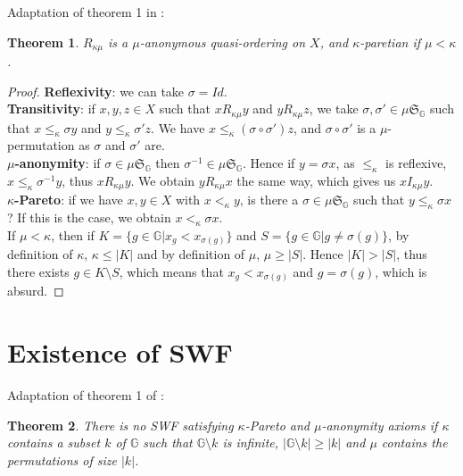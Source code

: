 \documentclass{article}
\newcommand{\G}{\mathbb{G}}
\newtheorem{theorem}{Theorem}
\begin{document}
Adaptation of theorem 1 in \cite{svensson80}:
\begin{theorem}
    $R_{\kappa\mu}$ is a $\mu$-anonymous quasi-ordering on $X$, and $\kappa$-paretian if
    $\mu < \kappa$. %
\end{theorem}
\begin{proof}
    \textbf{Reflexivity}: we can take $\sigma = Id$.\\
    \textbf{Transitivity}: if $x,y,z\in X$ such that $x R_{\kappa\mu} y$ and $y R_{\kappa\mu} z$,
    we take $\sigma,\sigma'\in \mu\mathfrak{S}_\G$ such that $x\leq_\kappa \sigma y$ and
    $y\leq_\kappa \sigma' z$. We have $x\leq_\kappa (\sigma\circ\sigma')z$,
    and $\sigma\circ\sigma'$ is a $\mu$-permutation as $\sigma$ and $\sigma'$ are.\\
    \textbf{$\mu$-anonymity}: if $\sigma\in\mu\mathfrak{S}_\G$
    then $\sigma^{-1}\in\mu\mathfrak{S}_\G$. Hence if $y=\sigma x$, as $\leq_\kappa$ is reflexive,
    $x\leq_\kappa\sigma^{-1}y$, thus $x R_{\kappa\mu} y$. We obtain $y R_{\kappa\mu} x$ the same
    way, which gives us $x I_{\kappa\mu} y$.\\
    \textbf{$\kappa$-Pareto}: if we have $x,y\in X$ with $x<_\kappa y$, is there a
    $\sigma\in \mu\mathfrak{S}_\G$ such that $y\leq_\kappa \sigma x$? If this is the case,
    we obtain $x<_\kappa \sigma x$.\\
    If $\mu < \kappa$, then if $K=\{g\in\G|x_g<x_{\sigma(g)}\}$ and
    $S = \{g\in\G|g \neq\sigma(g)\}$,
    by definition of $\kappa$, $\kappa\leq|K|$ and by definition of $\mu$, $\mu\geq |S|$.
    Hence $|K|>|S|$, thus there exists $g\in K\setminus S$, which means that
    $x_g<x_{\sigma(g)}$ and $g=\sigma(g)$, which is absurd.
\end{proof}

\section{Existence of SWF}

Adaptation of theorem 1 of \cite{basumitra03}:
\begin{theorem}
  There is no SWF satisfying $\kappa$-Pareto and $\mu$-anonymity axioms if $\kappa$ contains a subset $k$ of $\mathbb G$ such that $\mathbb G\setminus k$ is infinite, $|\mathbb G\setminus k|\geq |k|$ and $\mu$ contains the permutations of size $|k|$.
\end{theorem}
\end{document}
